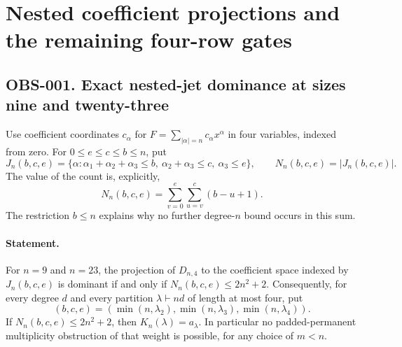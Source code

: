 \section{Nested coefficient projections and the remaining four-row gates}

\subsection{OBS-001. Exact nested-jet dominance at sizes nine and twenty-three}
Use coefficient coordinates $c_\alpha$ for
$F=\sum_{|\alpha|=n}c_\alpha x^\alpha$ in four variables, indexed from zero.
For $0\le e\le c\le b\le n$, put
\[
 J_n(b,c,e)=\{\alpha:\alpha_1+\alpha_2+\alpha_3\le b,
       \ \alpha_2+\alpha_3\le c,\ \alpha_3\le e\},
 \qquad N_n(b,c,e)=|J_n(b,c,e)|.
\]
The value of the count is, explicitly,
\[
 N_n(b,c,e)=\sum_{v=0}^{e}\sum_{u=v}^{c}(b-u+1).
\]
The restriction $b\le n$ explains why no further degree-$n$ bound occurs
in this sum.

\paragraph{Statement.}
For $n=9$ and $n=23$, the projection of $D_{n,4}$ to the coefficient
space indexed by $J_n(b,c,e)$ is dominant if and only if
$N_n(b,c,e)\le 2n^2+2$.
Consequently, for every degree $d$ and every partition
$\lambda\vdash nd$ of length at most four, put
\[
 (b,c,e)=(\min(n,\lambda_2),\min(n,\lambda_3),\min(n,\lambda_4)).
\]
If $N_n(b,c,e)\le 2n^2+2$, then $K_n(\lambda)=a_\lambda$.
In particular no padded-permanent multiplicity obstruction of that
weight is possible, for any choice of $m<n$.

